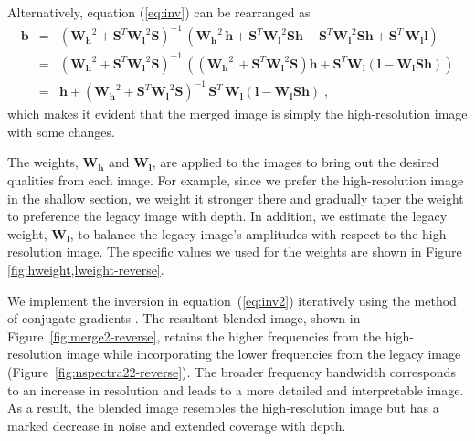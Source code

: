     Alternatively, equation (\ref{eq:inv}) can be rearranged as
    \begin{eqnarray}
        \nonumber
        \mathbf{b} & = & \left(\mathbf{W_h}^2 + \mathbf{S}^T\mathbf{W_l}^2\mathbf{S}\right)^{-1}\,\left(\mathbf{W_h}^2\,\mathbf{h}+\mathbf{S}^T\mathbf{W_l}^2\mathbf{S}\mathbf{h}-\mathbf{S}^T\mathbf{W_l}^2\mathbf{S}\mathbf{h}+\mathbf{S}^T\,\mathbf{W_l}\mathbf{l}\right) \\
    \nonumber
        & = & \left(\mathbf{W_h}^2 + \mathbf{S}^T\mathbf{W_l}^2\mathbf{S}\right)^{-1}\,\left(\left(\mathbf{W_h}^2\,+\mathbf{S}^T\mathbf{W_l}^2\mathbf{S}\right)\mathbf{h} + \mathbf{S}^T\mathbf{W_l}\left(\mathbf{l}-\mathbf{W_l}\mathbf{S}\mathbf{h}\right)\right) \\
        & = & \mathbf{h} +  \left(\mathbf{W_h}^2 + \mathbf{S}^T\mathbf{W_l}^2\mathbf{S}\right)^{-1}\,
        \mathbf{S}^T\,\mathbf{W_l}\left(\mathbf{l - W_l S h}\right)\;,
        \label{eq:inv2}
    \end{eqnarray}
    which makes it evident that the merged image is simply the high-resolution image with some changes.
    
    The weights, $\mathbf{W_h}$ and $\mathbf{W_l}$, are applied to the images to bring out the desired qualities from each image. 
    For example, since we prefer the high-resolution image in the shallow section, we weight it stronger there and gradually taper the weight to preference the legacy image with depth. 
    In addition, we estimate the legacy weight, $\mathbf{W_l}$, to balance the legacy image's amplitudes with respect to the high-resolution image. 
    The specific values we used for the weights are shown in Figure \ref{fig:hweight,lweight-reverse}.
    
    
    
    We implement the inversion in equation~(\ref{eq:inv2}) iteratively using the method of conjugate gradients \cite[]{conjgrad}. 
    The resultant blended image, shown in Figure~\ref{fig:merge2-reverse}, retains the higher frequencies from the high-resolution image while incorporating the lower frequencies from the legacy image (Figure~\ref{fig:nspectra22-reverse}). 
    The broader frequency bandwidth corresponds to an increase in resolution and leads to a more detailed and interpretable image.  
    As a result, the blended image resembles the high-resolution image but has a marked decrease in noise and extended coverage with depth. 
    
